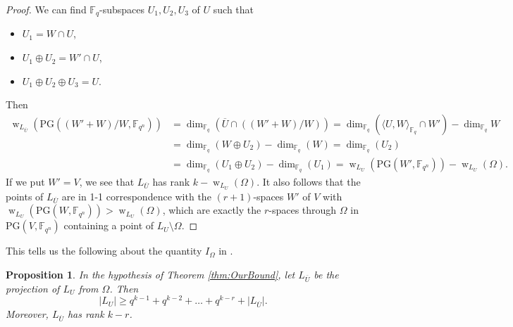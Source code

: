 \documentclass[11pt]{article}
\newtheorem{proposition}[theorem]{Proposition}
\theoremstyle{definition}
\newcommand{\fqn}{\mathbb{F}_{q^n}}
\newcommand{\F}{{\mathbb F}}
\newcommand{\fq}{{\mathbb F}_{q}}
\newcommand{\PG}{\mathrm{PG}}
\newcommand{\pg}{\PG}
\DeclareMathOperator{\ww}{w}
\begin{document}
\begin{proof}
 We can find $\fq$-subspaces $U_1, U_2, U_3$ of $U$ such that
 \begin{itemize}
  \item $U_1 = W \cap U$,
  \item $U_1 \oplus U_2 = W' \cap U$,
  \item $U_1 \oplus U_2 \oplus U_3 = U$.
 \end{itemize}
Then
 \begin{align*}
 \ww_{L_{\overline U}}(\pg((W'+W)/W,\fqn))
 & = \dim_{\F_q} (\overline U \cap ((W' + W)/W))
 = \dim_{\F_q} (\langle U,W \rangle_{\F_q} \cap W') - \dim_{\F_q} W \\
 & = \dim_{\F_q} (W \oplus U_2) - \dim_{\F_q}( W)
 = \dim_{\F_q} (U_2) \\
 & = \dim_{\F_q} (U_1 \oplus U_2) - \dim_{\F_q} (U_1)
 = \ww_{L_U}(\pg(W',\fqn)) - \ww_{L_U}(\Omega).
 \end{align*}
If we put $W' = V$, we see that $L_{\overline U}$ has rank $k- \ww_{L_U}(\Omega)$.
It also follows that the points of $L_{\overline U}$ are in 1-1 correspondence with the $(r+1)$-spaces $W'$ of $V$ with $\ww_{L_U}(\pg(W,\fqn)) > \ww_{L_U}(\Omega)$, which are exactly the $r$-spaces through $\Omega$ in $\pg(V,\fqn)$ containing a point of $L_U \setminus \Omega$.
\end{proof}

This tells us the following about the quantity $I_\Omega$ in .

\begin{proposition} \label{prop:boundquotient}
In the hypothesis of Theorem \ref{thm:OurBound}, let $L_{\overline U}$ be the projection of $L_U$ from $\Omega$. Then
\begin{equation*}
 \lvert L_U \rvert \geq q^{k-1}+q^{k-2}+\ldots+q^{k-r}+\lvert  L_{\overline{U}} \rvert.
\end{equation*}
Moreover, $L_{\overline U}$ has rank $k-r$.
\end{proposition}


\end{document}
